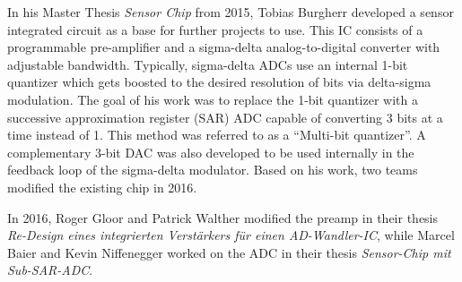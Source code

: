 \documentclass[a4paper,10pt]{article}
\begin{document}
\begin{description}[align=left]
    \item[Current State of Research:]
        In his  Master Thesis  \emph{Sensor Chip}  from 2015,  Tobias Burgherr
        developed  a  sensor   integrated  circuit  as  a   base  for  further
        projects  to use. This  IC  consists of  a programmable  pre-amplifier
        and   a  sigma-delta   analog-to-digital  converter   with  adjustable
        bandwidth. Typically, sigma-delta ADCs use an internal 1-bit quantizer
        which gets boosted  to the desired resolution of  bits via delta-sigma
        modulation. The goal  of his work  was to replace the  1-bit quantizer
        with  a  successive  approximation   register  (SAR)  ADC  capable  of
        converting 3  bits at a time  instead of 1.  This  method was referred
        to  as  a  ``Multi-bit  quantizer''. A  complementary  3-bit  DAC  was
        also  developed to  be used  internally in  the feedback  loop of  the
        sigma-delta  modulator. Based  on his  work,  two  teams modified  the
        existing chip in 2016.

        In 2016, Roger Gloor and Patrick  Walther modified the preamp in their
        thesis  \emph{Re-Design eines  integrierten Verst\"arkers  f\"ur einen
        AD-Wandler-IC}, while Marcel Baier and Kevin Niffenegger worked on the
        ADC in their thesis \emph{Sensor-Chip mit Sub-SAR-ADC}.


\end{description}
\end{document}
